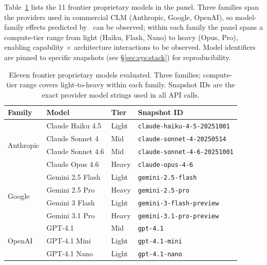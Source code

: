 Table~\ref{tab:models} lists the 11 frontier proprietary models in the panel. Three
families span the providers used in commercial CLM (Anthropic, Google, OpenAI), so
model-family effects predicted by~\cite{bogavelli2025agentarch} can be observed; within
each family the panel spans a compute-tier range from light (Haiku, Flash, Nano) to
heavy (Opus, Pro), enabling capability $\times$ architecture interactions to be
observed. Model identifiers are pinned to specific snapshots (see §\ref{sec:sys:stack})
for reproducibility.

\begin{table}[h]
  \centering
  \small
  \caption{Eleven frontier proprietary models evaluated. Three families; compute-tier
  range covers light-to-heavy within each family. Snapshot IDs are the exact
  provider model strings used in all API calls.}
  \label{tab:models}
  \begin{tabular}{llll}
    \toprule
    \textbf{Family} & \textbf{Model} & \textbf{Tier} & \textbf{Snapshot ID} \\
    \midrule
    \multirow{4}{*}{Anthropic}
      & Claude Haiku 4.5  & Light & \texttt{claude-haiku-4-5-20251001}  \\
      & Claude Sonnet 4   & Mid   & \texttt{claude-sonnet-4-20250514}   \\
      & Claude Sonnet 4.6 & Mid   & \texttt{claude-sonnet-4-6-20251001} \\
      & Claude Opus 4.6   & Heavy & \texttt{claude-opus-4-6}            \\
    \midrule
    \multirow{4}{*}{Google}
      & Gemini 2.5 Flash  & Light & \texttt{gemini-2.5-flash}           \\
      & Gemini 2.5 Pro    & Heavy & \texttt{gemini-2.5-pro}             \\
      & Gemini 3 Flash    & Light & \texttt{gemini-3-flash-preview}      \\
      & Gemini 3.1 Pro    & Heavy & \texttt{gemini-3.1-pro-preview}      \\
    \midrule
    \multirow{3}{*}{OpenAI}
      & GPT-4.1           & Mid   & \texttt{gpt-4.1}                    \\
      & GPT-4.1 Mini      & Light & \texttt{gpt-4.1-mini}               \\
      & GPT-4.1 Nano      & Light & \texttt{gpt-4.1-nano}               \\
    \bottomrule
  \end{tabular}
\end{table}

